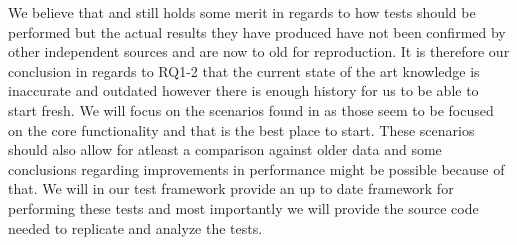 We believe that \cite{Sanjay2011} and \cite{Perera07,Perera07R2,Perera07R3,mulesoft08} still holds some merit in regards to how tests should be performed but the actual results they have produced have not been confirmed by other independent sources and are now to old for reproduction. 
It is therefore our conclusion in regards to RQ1-2 that the current state of the art knowledge is inaccurate and outdated however there is enough history for us to be able to start fresh.
We will focus on the scenarios found in \cite{Perera07,Perera07R2,Perera07R3,mulesoft08,Sanjay2011} as those seem to be focused on the core functionality and that is the best place to start.
These scenarios should also allow for atleast a comparison against older data and some conclusions regarding improvements in performance might be possible because of that.
We will in our test framework provide an up to date framework for performing these tests and most importantly we will provide the source code needed to replicate and analyze the tests.